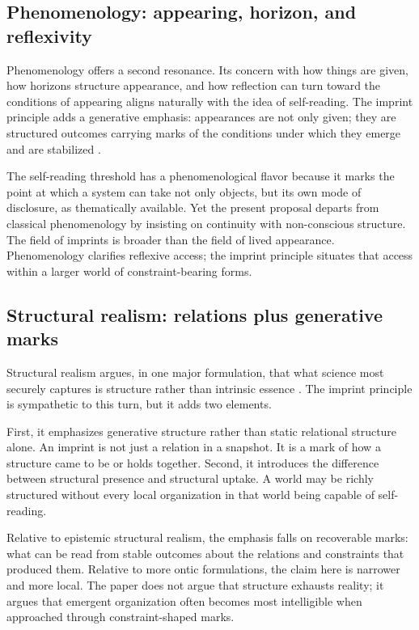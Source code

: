 \documentclass[12pt]{article}
\begin{document}
\subsection{Phenomenology: appearing, horizon, and reflexivity}

Phenomenology offers a second resonance. Its concern with how things are given, how horizons structure appearance, and how reflection can turn toward the conditions of appearing aligns naturally with the idea of self-reading. The imprint principle adds a generative emphasis: appearances are not only given; they are structured outcomes carrying marks of the conditions under which they emerge and are stabilized \cite{VarelaThompsonRosch1991,Thompson2007}.

The self-reading threshold has a phenomenological flavor because it marks the point at which a system can take not only objects, but its own mode of disclosure, as thematically available. Yet the present proposal departs from classical phenomenology by insisting on continuity with non-conscious structure. The field of imprints is broader than the field of lived appearance. Phenomenology clarifies reflexive access; the imprint principle situates that access within a larger world of constraint-bearing forms.

\subsection{Structural realism: relations plus generative marks}

Structural realism argues, in one major formulation, that what science most securely captures is structure rather than intrinsic essence \cite{Ladyman2007,French2014}. The imprint principle is sympathetic to this turn, but it adds two elements.

First, it emphasizes generative structure rather than static relational structure alone. An imprint is not just a relation in a snapshot. It is a mark of how a structure came to be or holds together. Second, it introduces the difference between structural presence and structural uptake. A world may be richly structured without every local organization in that world being capable of self-reading.

Relative to epistemic structural realism, the emphasis falls on recoverable marks: what can be read from stable outcomes about the relations and constraints that produced them. Relative to more ontic formulations, the claim here is narrower and more local. The paper does not argue that structure exhausts reality; it argues that emergent organization often becomes most intelligible when approached through constraint-shaped marks.
\end{document}
